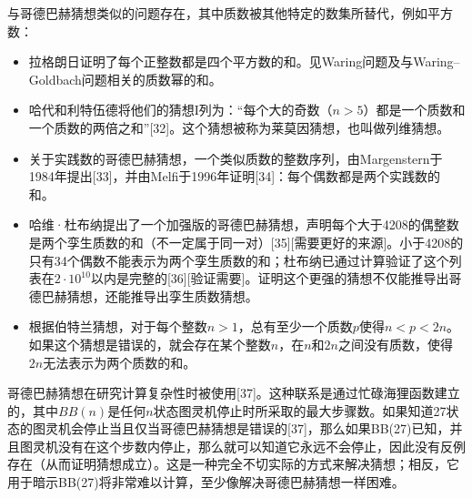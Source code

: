 与哥德巴赫猜想类似的问题存在，其中质数被其他特定的数集所替代，例如平方数：
\begin{itemize}
\item 拉格朗日证明了每个正整数都是四个平方数的和。见Waring问题及与Waring–Goldbach问题相关的质数幂的和。
\item 哈代和利特伍德将他们的猜想I列为：“每个大的奇数（\(n > 5\)）都是一个质数和一个质数的两倍之和”[32]。这个猜想被称为莱莫因猜想，也叫做列维猜想。
\item 关于实践数的哥德巴赫猜想，一个类似质数的整数序列，由Margenstern于1984年提出[33]，并由Melfi于1996年证明[34]：每个偶数都是两个实践数的和。
\item 哈维·杜布纳提出了一个加强版的哥德巴赫猜想，声明每个大于4208的偶整数是两个孪生质数的和（不一定属于同一对）[35][需要更好的来源]。小于4208的只有34个偶数不能表示为两个孪生质数的和；杜布纳已通过计算验证了这个列表在\(2\cdot10^{10}\)以内是完整的[36][验证需要]。证明这个更强的猜想不仅能推导出哥德巴赫猜想，还能推导出孪生质数猜想。
\item 根据伯特兰猜想，对于每个整数\(n>1\)，总有至少一个质数\(p\)使得\(n<p <2n\)。如果这个猜想是错误的，就会存在某个整数\(n\)，在\(n\)和\(2n\)之间没有质数，使得\(2n\)无法表示为两个质数的和。
\end{itemize}
哥德巴赫猜想在研究计算复杂性时被使用[37]。这种联系是通过忙碌海狸函数建立的，其中\(BB(n)\)是任何\(n\)状态图灵机停止时所采取的最大步骤数。如果知道27状态的图灵机会停止当且仅当哥德巴赫猜想是错误的[37]，那么如果BB(27)已知，并且图灵机没有在这个步数内停止，那么就可以知道它永远不会停止，因此没有反例存在（从而证明猜想成立）。这是一种完全不切实际的方式来解决猜想；相反，它用于暗示BB(27)将非常难以计算，至少像解决哥德巴赫猜想一样困难。
